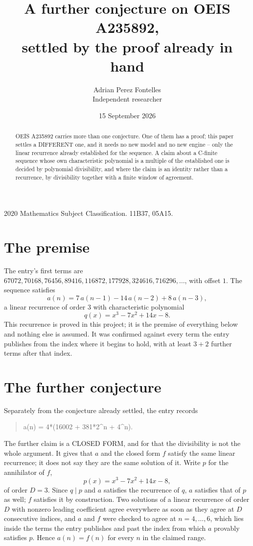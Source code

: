 \documentclass[11pt,a4paper]{article}
\title{A further conjecture on OEIS A235892,\\ \large settled by the proof already in hand}
\author{Adrian Perez Fontelles\\ \small Independent researcher}
\date{15 September 2026}
\theoremstyle{plain}
\theoremstyle{definition}
\begin{document}
\maketitle

\begin{abstract}
OEIS A235892 carries more than one conjecture. One of them has a proof; this paper settles a
DIFFERENT one, and it needs no new model and no new engine -- only the linear recurrence already
established for the sequence. A claim about a C-finite sequence whose own characteristic
polynomial is a multiple of the established one is decided by polynomial divisibility, and where
the claim is an identity rather than a recurrence, by divisibility together with a finite window
of agreement.
\end{abstract}

\noindent\small 2020 Mathematics Subject Classification. 11B37, 05A15.\normalsize

\section{The premise}

The entry's first terms are $67072, 70168, 76456, 89416, 116872, 177928, 324616, 716296,\dots$, with offset $1$. The sequence satisfies
\[
  a(n)=7\,a(n-1) - 14\,a(n-2) + 8\,a(n-3) ,
\]
a linear recurrence of order $3$ with characteristic polynomial
\[
  q(x)=x^{3} - 7 x^{2} + 14 x - 8 .
\]
This recurrence is proved in this project; it is the premise of everything below and nothing else is assumed.
It was confirmed against every term the entry publishes from the index where it begins to hold,
with at least $3+2$ further terms after that index.

\section{The further conjecture}

Separately from the conjecture already settled, the entry records

\begin{quote}\raggedright a(n) = 4*(16002 + 381*2\^{}n + 4\^{}n).\end{quote}

The further claim is a CLOSED FORM, and for that the divisibility is not the whole argument. It
gives that $a$ and the closed form $f$ satisfy the same linear recurrence; it does not say they
are the same solution of it. Write $p$ for the annihilator of $f$,
\[
  p(x)=x^{3} - 7 x^{2} + 14 x - 8 ,
\]
of order $D=3$. Since $q\mid p$ and $a$ satisfies the recurrence of $q$, $a$ satisfies that of
$p$ as well; $f$ satisfies it by construction. Two solutions of a linear recurrence of order $D$
with nonzero leading coefficient agree everywhere as soon as they agree at $D$ consecutive
indices, and $a$ and $f$ were checked to agree at $n=4,\dots,6$,
which lies inside the terms the entry publishes and past the index from which $a$ provably
satisfies $p$. Hence $a(n)=f(n)$ for every $n$ in the claimed range.
\end{document}
